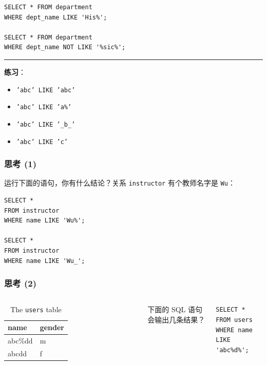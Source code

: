 \documentclass[aspectratio=169, 14pt]{beamer}
\begin{document}
\begin{frame}[fragile]
    \begin{verbatim} 
SELECT * FROM department
WHERE dept_name LIKE 'His%';

SELECT * FROM department
WHERE dept_name NOT LIKE '%sic%';
    \end{verbatim}
    \pause
    \noindent\rule{\textwidth}{1pt}
    {\large {}} \textbf{练习}：
\begin{itemize}
    \item \texttt{'abc' LIKE 'abc'}    
    \item \texttt{'abc' LIKE 'a\%'} 
    \item \texttt{'abc' LIKE '\_b\_'} 
    \item \texttt{'abc' LIKE 'c'}
\end{itemize}
\end{frame}


\begin{frame}[fragile]
    \frametitle{思考 (1)}

运行下面的语句，你有什么结论？关系 \texttt{instructor} 有个教师名字是 \texttt{Wu}：

\begin{verbatim} 
SELECT *
FROM instructor
WHERE name LIKE 'Wu%';

SELECT *
FROM instructor
WHERE name LIKE 'Wu_';
\end{verbatim}
    
\end{frame}

\begin{frame}[fragile]
    \frametitle{思考 (2)}

    \begin{columns}
        \begin{table}
            \caption*{The \texttt{users} table}
            \begin{tabular}{ll}
              \toprule
              name & gender \\
              \midrule
              abc\%dd & m \\
              abcdd & f \\
              \bottomrule
            \end{tabular}
        \end{table}
        {\large {}} 下面的 SQL 语句会输出几条结果？

        \begin{verbatim} 
SELECT *
FROM users
WHERE name LIKE 'abc%d%';
        \end{verbatim}
    \end{columns}



\end{frame}
\end{document}
